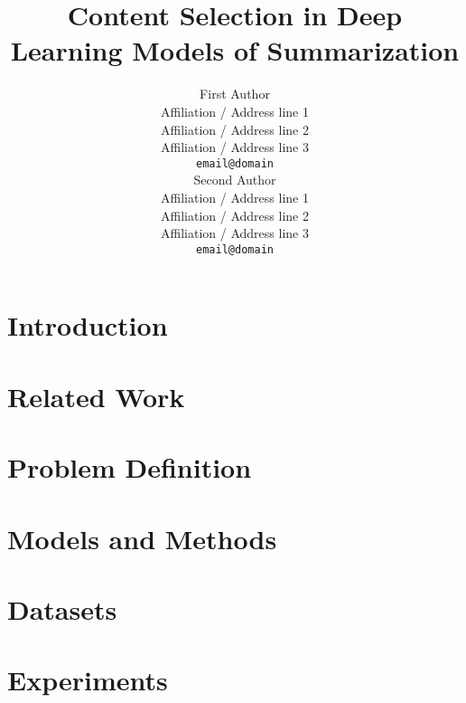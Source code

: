 \documentclass[11pt,a4paper]{article}
\title{Content Selection in Deep Learning Models of Summarization}
\author{First Author \\
  Affiliation / Address line 1 \\
  Affiliation / Address line 2 \\
  Affiliation / Address line 3 \\
  {\tt email@domain} \\\And
  Second Author \\
  Affiliation / Address line 1 \\
  Affiliation / Address line 2 \\
  Affiliation / Address line 3 \\
  {\tt email@domain} \\}
\date{}
\begin{document}
\maketitle
\begin{abstract}
\end{abstract}



\section{Introduction}


\section{Related Work}


\section{Problem Definition}


\section{Models and Methods}





\section{Datasets}
\label{sec:datasets}



\section{Experiments}

\end{document}
